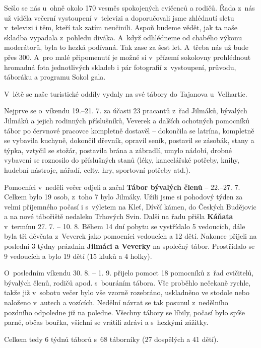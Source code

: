\documentclass[11pt]{article}
\begin{document}
Sešlo se nás u~ohně okolo 170 vesměs spokojených cvičenců a rodičů. Řada z~nás už viděla večerní vystoupení v~televizi a doporučovali jsme zhlédnutí sletu v~televizi i těm, kteří tak zatím neučinili. Aspoň budeme vědět, jak ta naše skladba vypadala z~pohledu diváka. A~když odhlédneme od chabého výkonu moderátorů, byla to hezká podívaná. Tak zase za šest let. A~třeba nás už bude přes 300. A~pro malé připomenutí je možné si v~přízemí sokolovny prohlédnout hromadná fota jednotlivých skladeb i pár fotografií z~vystoupení, průvodu, táboráku a programu Sokol gala.

V~létě se naše turistické oddíly vydaly na své tábory do Tajanova u~Velhartic. 

Nejprve se o~víkendu 19.–21. 7. za účasti 23 pracantů z~řad Jilmáků, bývalých Jilmáků a jejich rodinných příslušníků, Veverek a dalších ochotných pomocníků tábor po červnové pracovce kompletně dostavěl – dokončila se latrína, kompletně se vybavila kuchyně, dokončil dřevník, opravil seník, postavil se zásobák, stany a týpka, vztyčil se stožár, postavila brána a zábradlí, umylo nádobí, drobné vybavení se roznosilo do příslušných stanů (léky, kancelářské potřeby, knihy, hudební nástroje, nářadí, celty, hry, sportovní potřeby atd.).

Pomocníci v~neděli večer odjeli a začal \textbf{Tábor bývalých členů} – 22.–27. 7. Celkem bylo 19 osob, z~toho 7 bylo Jilmáky. Užili jsme si pohodový týden za velmi příjemného počasí i s~výletem na Kleť, Dívčí kámen, do Českých Budějovic a na nové tábořiště nedaleko Trhových Svin. Další na řadu přišla \textbf{Káňata} v~termínu 27. 7. – 10. 8. Během 14 dní pobytu se vystřídalo 5 vedoucích, dále byla tři děvčata z~Veverek jako pomocníci vedoucích a 12 dětí. Nakonec přijeli na poslední 3 týdny prázdnin \textbf{Jilmáci a Veverky} na společný tábor. Prostřídalo se 9 vedoucích a bylo 19 dětí (15 kluků a 4 holky).

O~posledním víkendu 30. 8. – 1. 9. přijelo pomoct 18 pomocníků z~řad cvičitelů, bývalých členů, rodičů apod. s~bouráním tábora. Vše proběhlo nečekaně rychle, takže již v~sobotu večer bylo vše vzorně rozebráno, uskladněno ve stodole nebo naloženo v~autech a vozících. Nedělní návrat se tak posunul z~nedělního pozdního odpoledne již na poledne. Všechny tábory se líbily, počasí bylo spíše parné, občas bouřka, všichni se vrátili zdrávi a s~hezkými zážitky. 

Celkem tedy 6 týdnů táborů s~68 táborníky (27 dospělých a 41 dětí).
\end{document}
